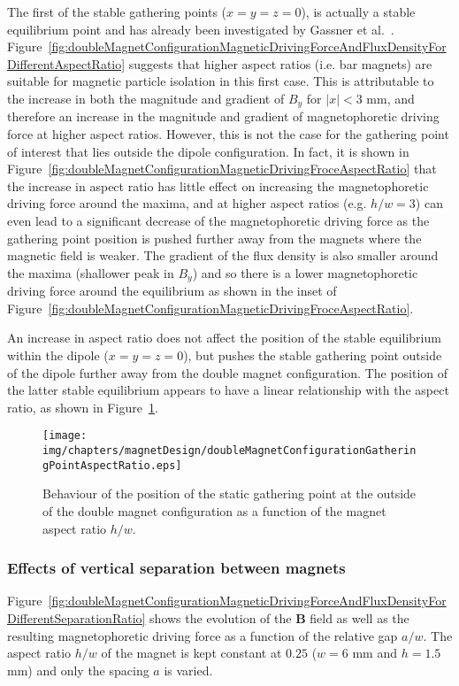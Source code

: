 The first of the stable gathering points ($x=y=z=0$), is actually a stable equilibrium point and has already been investigated by Gassner et al.~\cite{Gassner2009}. Figure~\ref{fig:doubleMagnetConfigurationMagneticDrivingForceAndFluxDensityForDifferentAspectRatio} suggests that higher aspect ratios (i.e. bar magnets) are suitable for magnetic particle isolation in this first case. This is attributable to the increase in both the magnitude and gradient of $B_{y}$ for $|x| < 3$ mm, and therefore an increase in the magnitude and gradient of magnetophoretic driving force at higher aspect ratios. However, this is not the case for the gathering point of interest that lies outside the dipole configuration. In fact, it is shown in Figure~\ref{fig:doubleMagnetConfigurationMagneticDrivingFroceAspectRatio} that the increase in aspect ratio has little effect on increasing the magnetophoretic driving force around the maxima, and at higher aspect ratios (e.g. $h/w = 3$) can even lead to a significant decrease of the magnetophoretic driving force as the gathering point position is pushed further away from the magnets where the magnetic field is weaker. The gradient of the flux density is also smaller around the maxima (shallower peak in $B_{y}$) and so there is a lower magnetophoretic driving force around the equilibrium as shown in the inset of Figure~\ref{fig:doubleMagnetConfigurationMagneticDrivingFroceAspectRatio}.

An increase in aspect ratio does not affect the position of the stable equilibrium within the dipole ($x=y=z=0$), but pushes the stable gathering point outside of the dipole further away from the double magnet configuration. The position of the latter stable equilibrium appears to have a linear relationship with the aspect ratio, as shown in Figure~\ref{fig:stableGatheringPointAspectRatio}.

\begin{figure}[!htb]%
\centering
	\texttt{[image: img/chapters/magnetDesign/doubleMagnetConfigurationGatheringPointAspectRatio.eps]}
\caption[Behaviour of position of the static gathering point as a function of the magnet aspect ratio]{Behaviour of the position of the static gathering point at the outside of the double magnet configuration as a function of the magnet aspect ratio $h/w$.}
\label{fig:stableGatheringPointAspectRatio}%
\end{figure}

\subsubsection{Effects of vertical separation between magnets}\label{subsubsec:EffectsOfVerticalSeparationBetweenMgnets}
Figure~\ref{fig:doubleMagnetConfigurationMagneticDrivingForceAndFluxDensityForDifferentSeparationRatio} shows the evolution of the $\mathbf{B}$ field as well as the resulting magnetophoretic driving force as a function of the relative gap $a/w$. The aspect ratio $h/w$ of the magnet is kept constant at $0.25$ ($w=6$ mm and $h=1.5$ mm) and only the spacing $a$ is varied.

